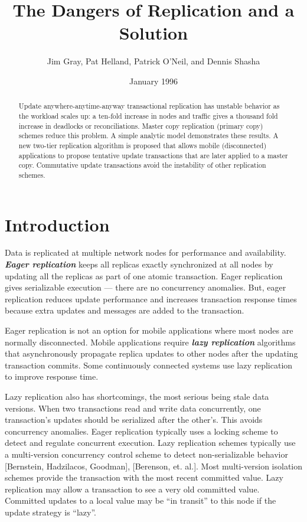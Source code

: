 \documentclass[a4paper,11pt,twoside,openright]{article}
\title{The Dangers of Replication and a Solution}
\author{Jim Gray, Pat Helland, Patrick O'Neil, and Dennis Shasha}
\date{January 1996}
\begin{document}
\maketitle

\begin{abstract}

Update anywhere-anytime-anyway transactional
replication has unstable behavior as the workload scales up: a ten-fold
increase in nodes and traffic gives a thousand fold increase in
deadlocks or reconciliations. Master copy replication (primary copy)
schemes reduce this problem. A simple analytic model demonstrates these
results. A new two-tier replication algorithm is proposed that allows
mobile (disconnected) applications to propose tentative update
transactions that are later applied to a master copy. Commutative update
transactions avoid the instability of other replication schemes.

\end{abstract}

\section{Introduction}

Data is replicated at multiple network nodes for performance and
availability. \emph{\textbf{Eager replication}} keeps all replicas
exactly synchronized at all nodes by updating all the replicas as part
of one atomic transaction. Eager replication gives serializable
execution --- there are no concurrency anomalies. But, eager replication
reduces update performance and increases transaction response times
because extra updates and messages are added to the transaction.

Eager replication is not an option for mobile applications where most
nodes are normally disconnected. Mobile applications require
\emph{\textbf{lazy replication}} algorithms that asynchronously
propagate replica updates to other nodes after the updating transaction
commits. Some continuously connected systems use lazy replication to
improve response time.

Lazy replication also has shortcomings, the most serious being stale
data versions. When two transactions read and write data concurrently,
one transaction's updates should be serialized after the other's. This
avoids concurrency anomalies. Eager replication typically uses a locking
scheme to detect and regulate concurrent execution. Lazy replication
schemes typically use a multi-version concurrency control scheme to
detect non-serializable behavior {[}Bernstein, Hadzilacos, Goodman{]},
{[}Berenson, et. al.{]}. Most multi-version isolation schemes provide
the transaction with the most recent committed value. Lazy replication
may allow a transaction to see a very old committed value. Committed
updates to a local value may be ``in transit'' to this node if the
update strategy is ``lazy''.
\end{document}
